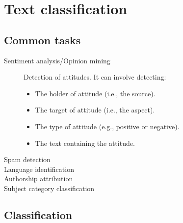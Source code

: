 \chapter{Text classification}


\section{Common tasks}

\begin{description}
    \item[Sentiment analysis/Opinion mining] 
        Detection of attitudes. It can involve detecting:
        \begin{itemize}
            \item The holder of attitude (i.e., the source).
            \item The target of attitude (i.e., the aspect).
            \item The type of attitude (e.g., positive or negative).
            \item The text containing the attitude. 
        \end{itemize}

    \item[Spam detection]
    \item[Language identification]
    \item[Authorship attribution]
    \item[Subject category classification] 
\end{description}


\section{Classification}

